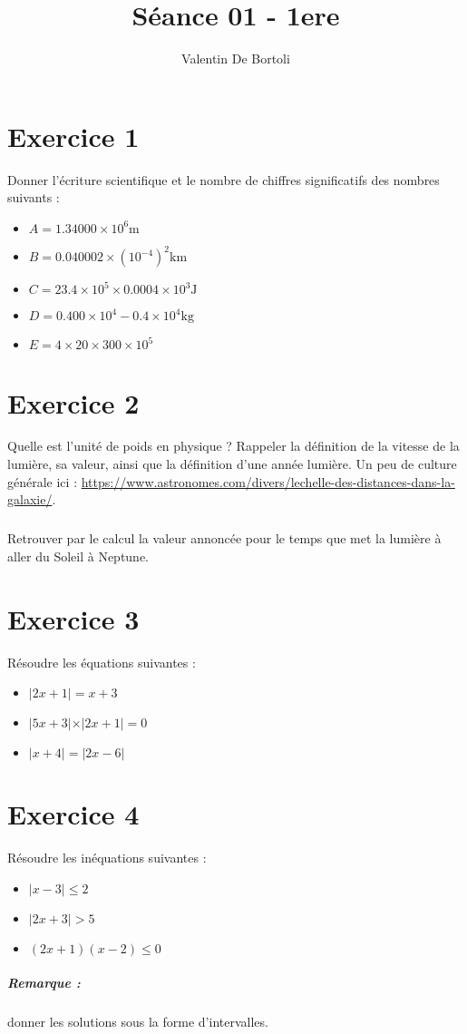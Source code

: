 \documentclass[10pt,a4paper]{article}
\title{Séance 01 - 1ere}
\author{Valentin De Bortoli}
\begin{document}
\maketitle
\section{Exercice 1}
Donner l'écriture scientifique et le nombre de chiffres significatifs des nombres suivants :
\begin{itemize}
\item $A = 1.34000  \times 10^6 \text{m}$
\item $B = 0.040002 \times \left( 10^{-4} \right)^2 \text{km}$
\item $C = 23.4 \times 10^5 \times 0.0004 \times 10^3\text{J}$
\item $D = 0.400 \times 10^4 - 0.4 \times 10^4\text{kg}$
\item $E = 4 \times 20 \times 300 \times 10^5$
\end{itemize}

\section{Exercice 2}
Quelle est l'unité de poids en physique ? Rappeler la définition de la vitesse de la lumière, sa valeur, ainsi que la définition d'une année lumière. Un peu de culture générale ici : \url{https://www.astronomes.com/divers/lechelle-des-distances-dans-la-galaxie/}.
\subparagraph{} Retrouver par le calcul la valeur annoncée pour le temps que met la lumière à aller du Soleil à Neptune.

\section{Exercice 3}
Résoudre les équations suivantes :
\begin{itemize}
\item $\vert 2x +1 \vert = x+3$
\item $\vert 5x+ 3 \vert \times \vert 2x +1 \vert = 0$
\item $ \vert x + 4 \vert = \vert 2x - 6 \vert$
\end{itemize}

\section{Exercice 4}
Résoudre les inéquations suivantes :
\begin{itemize}
\item $\vert x - 3 \vert \le 2$
\item $\vert 2x +3 \vert > 5$
\item $(2x+1)(x-2) \le 0$
\end{itemize}
\subparagraph{Remarque :} donner les solutions sous la forme d'intervalles.
\end{document}
